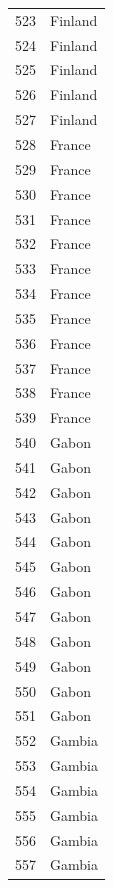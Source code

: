 \documentclass[
  letterpaper,
  DIV=11,
  numbers=noendperiod]{scrreprt}
\begin{document}
\begin{tabular}{ll}
523  &                   Finland \\
524  &                   Finland \\
525  &                   Finland \\
526  &                   Finland \\
527  &                   Finland \\
528  &                    France \\
529  &                    France \\
530  &                    France \\
531  &                    France \\
532  &                    France \\
533  &                    France \\
534  &                    France \\
535  &                    France \\
536  &                    France \\
537  &                    France \\
538  &                    France \\
539  &                    France \\
540  &                     Gabon \\
541  &                     Gabon \\
542  &                     Gabon \\
543  &                     Gabon \\
544  &                     Gabon \\
545  &                     Gabon \\
546  &                     Gabon \\
547  &                     Gabon \\
548  &                     Gabon \\
549  &                     Gabon \\
550  &                     Gabon \\
551  &                     Gabon \\
552  &                    Gambia \\
553  &                    Gambia \\
554  &                    Gambia \\
555  &                    Gambia \\
556  &                    Gambia \\
557  &                    Gambia \\

\end{tabular}
\end{document}
